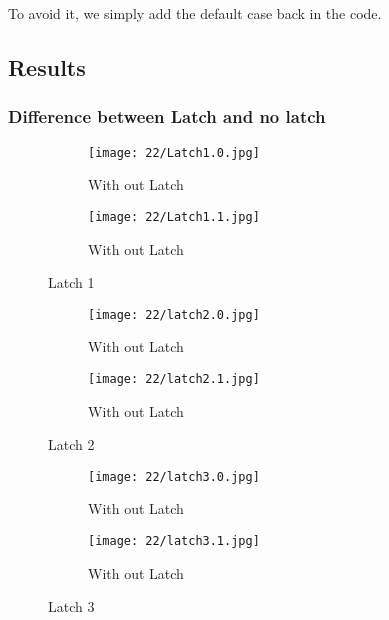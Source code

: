         To avoid it, we simply add the default case back in the code.
    
    
\subsection{Results}%
    \subsubsection{Difference between Latch and no latch}
    \FloatBarrier
        \begin{figure}[]
                \FloatBarrier
            \centering
            \begin{subfigure}[h]{0.45\textwidth}
                \texttt{[image: 22/Latch1.0.jpg]}
                \caption{With out Latch}
            \end{subfigure}
            \begin{subfigure}[h]{0.45\textwidth}
                \texttt{[image: 22/Latch1.1.jpg]}
                \caption{With out Latch}
            \end{subfigure}
            \caption{Latch 1}
            \label{fig:Latch1}
                    \FloatBarrier
        \end{figure}

        \FloatBarrier
        \begin{figure}[h!]
            \centering
            \begin{subfigure}[h]{0.45\textwidth}
                \texttt{[image: 22/latch2.0.jpg]}
                \caption{With out Latch}
            \end{subfigure}
            \begin{subfigure}[h]{0.3\textwidth}
                \texttt{[image: 22/latch2.1.jpg]}
                \caption{With out Latch}
            \end{subfigure}
            \caption{Latch 2}
            \label{fig:Latch1}
        \end{figure}
                \FloatBarrier

                \FloatBarrier
        \begin{figure}[h!]
            \centering
            \begin{subfigure}[h]{0.45\textwidth}
                \texttt{[image: 22/latch3.0.jpg]}
                \caption{With out Latch}
            \end{subfigure}
            \begin{subfigure}[h]{0.45\textwidth}
                \texttt{[image: 22/latch3.1.jpg]}
                \caption{With out Latch}
            \end{subfigure}
            \caption{Latch 3}
            \label{fig:Latch1}
        \end{figure}
                \FloatBarrier
